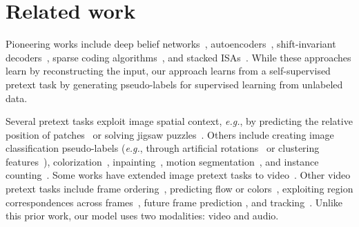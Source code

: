 \documentclass{article}
\begin{document}
\section{Related work}
\vspace{-2pt}
\label{sec:related_work}

\vspace{-3pt}
Pioneering works include deep belief networks~\cite{hinton2006fast}, autoencoders~\cite{hinton2006reducing,vincent2008extracting}, shift-invariant decoders~\cite{ranzato2007unsupervised}, sparse coding algorithms~\cite{lee2007efficient}, and stacked ISAs~\cite{le2011learning}. While these approaches learn by reconstructing the input, our approach learns from a self-supervised pretext task by generating pseudo-labels for supervised learning from unlabeled data.

\vspace{-3pt}
Several pretext tasks exploit image spatial context, \emph{e.g.}, by predicting the relative position of patches~\cite{doersch2015unsupervised} or solving jigsaw puzzles~\cite{noroozi2016unsupervised}. 
Others include creating image classification pseudo-labels (\emph{e.g.}, through artificial rotations~\cite{gidaris2018unsupervised} or clustering features~\cite{caron2018deep}), colorization~\cite{zhang2016colorful}, inpainting~\cite{pathak2016context}, motion segmentation~\cite{pathak2017learning}, and instance counting~\cite{noroozi2017representation}.
Some works have extended image pretext tasks to video~\cite{kim2019self,motion_statistics,clip_order}. Other video pretext tasks include frame ordering~\cite{fernando2017self,lee2017unsupervised,misra2016shuffle,wei2018learning}, predicting flow or colors~\cite{lai2019self,vondrick2018tracking}, exploiting region correspondences across frames~\cite{isola2015learning,jayaraman2016slow,wang2015unsupervised,wang2019learning}, future frame prediction \cite{lotter2016deep,mathieu2015deep,srivastava2015unsupervised,vondrick2016anticipating,vondrick2016generating}, and tracking~\cite{XiaolongWang19}. Unlike this prior work, our model uses two modalities: video and audio.
\end{document}
